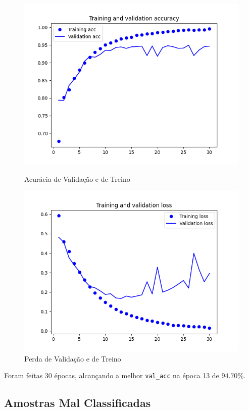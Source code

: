 \begin{figure}[H]
    \centering
    \includegraphics[width=\textwidth]{imgs/Test_5/dataset_5/train_test_acc.png}
    \caption{Acurácia de Validação e de Treino}
    \includegraphics[width=\textwidth]{imgs/Test_5/dataset_5/train_test_loss.png}
    \caption{Perda de Validação e de Treino}
    \label{fig:sub2}
\end{figure}

Foram feitas 30 épocas, alcançando a melhor \texttt{val\_acc} na época 13 de \(94.70\%\).

\subsection{Amostras Mal Classificadas}

